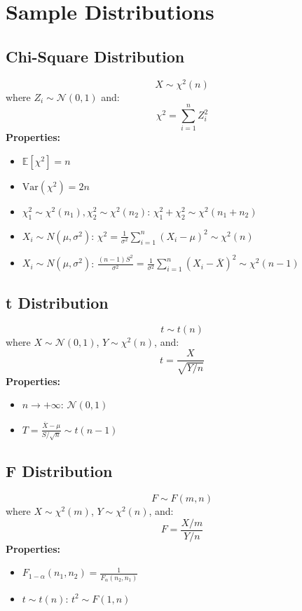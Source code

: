 \documentclass{article}
\begin{document}
\newpage
\section{Sample Distributions}

\subsection{Chi-Square Distribution}
\[
    X \sim \chi^2(n)
\]
where $Z_i \sim \mathcal{N}(0,1)$ and:
\[
    \chi^2 = \sum_{i=1}^{n} Z_i^2
\]
\textbf{Properties:}
\begin{itemize}
    \item $\mathbb{E}[\chi^2] = n$
    \item $\text{Var}(\chi^2) = 2n$
    \item $\chi_1^2 \sim \chi^2(n_1), \chi_2^2 \sim \chi^2(n_2)$: $\chi_1^2 + \chi_2^2 \sim \chi^2(n_1 + n_2)$
    \item $X_i \sim N(\mu, \sigma^2)$: $\chi^2 = \frac{1}{\sigma^2}\sum_{i=1}^{n}(X_i - \mu)^2 \sim \chi^2(n)$
    \item $X_i \sim N(\mu, \sigma^2)$: $\frac{(n-1)S^2}{\sigma^2} = \frac{1}{\sigma^2}\sum_{i=1}^{n}(X_i - \overline{X})^2 \sim \chi^2(n-1)$
\end{itemize}

\subsection{t Distribution}
\[
    t \sim t(n)
\]
where $X \sim \mathcal{N}(0,1)$, $Y \sim \chi^2(n)$, and:
\[
    t = \frac{X}{\sqrt{Y/n}}
\]
\textbf{Properties:}
\begin{itemize}
    \item $n \rightarrow +\infty$: $\mathcal{N}(0,1)$
    \item $T = \frac{\overline{X} - \mu}{S/\sqrt{n}} \sim t(n-1)$
\end{itemize}

\subsection{F Distribution}
\[
    F \sim F(m,n)
\]
where $X \sim \chi^2(m)$, $Y \sim \chi^2(n)$, and:
\[
    F = \frac{X/m}{Y/n}
\]
\textbf{Properties:}
\begin{itemize}
    \item $F_{1-\alpha}(n_1, n_2) = \frac{1}{F_\alpha(n_2, n_1)}$
    \item $t \sim t(n)$: $t^2 \sim F(1, n)$
\end{itemize}
\end{document}
